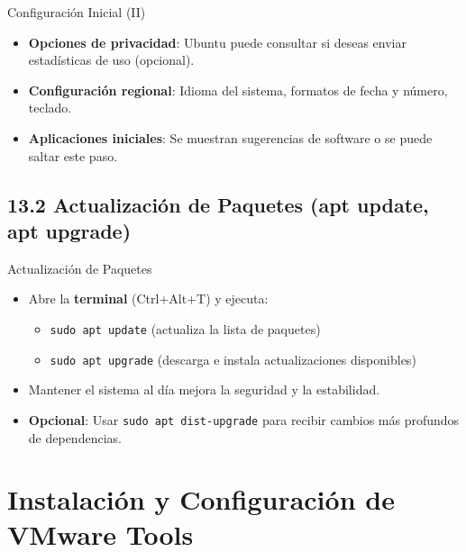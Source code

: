 \documentclass{beamer}
\begin{document}
\begin{frame}{Configuración Inicial (II)}
	\begin{itemize}
		\item \textbf{Opciones de privacidad}: Ubuntu puede consultar si deseas enviar estadísticas de uso (opcional).
		\item \textbf{Configuración regional}: Idioma del sistema, formatos de fecha y número, teclado.
		\item \textbf{Aplicaciones iniciales}: Se muestran sugerencias de software o se puede saltar este paso.
	\end{itemize}
\end{frame}

\subsection{13.2 Actualización de Paquetes (apt update, apt upgrade)}
\begin{frame}{Actualización de Paquetes}
	\begin{itemize}
		\item Abre la \textbf{terminal} (Ctrl+Alt+T) y ejecuta:
			\begin{itemize}
				\item \texttt{sudo apt update} (actualiza la lista de paquetes)
				\item \texttt{sudo apt upgrade} (descarga e instala actualizaciones disponibles)
			\end{itemize}
		\item Mantener el sistema al día mejora la seguridad y la estabilidad.
		\item \textbf{Opcional}: Usar \texttt{sudo apt dist-upgrade} para recibir cambios más profundos de dependencias.
	\end{itemize}
\end{frame}

\section{Instalación y Configuración de VMware Tools}

\end{document}
